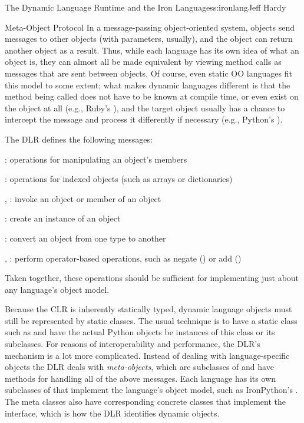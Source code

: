 \begin{aosachapter}{The Dynamic Language Runtime and the Iron Languages}{s:ironlang}{Jeff Hardy}
\begin{aosasect1}{Meta-Object Protocol}
In a message-passing object-oriented system, objects send messages to other
objects (with parameters, usually), and the object can return another object as
a result. Thus, while each language has its own idea of what an object is, they
can almost all be made equivalent by viewing method calls as messages that are
sent between objects. Of course, even static OO languages fit this model to
some extent; what makes dynamic languages different is that the method being
called does not have to be known at compile time, or even exist on the object
at all (e.g., Ruby's ), and the target object usually has
a chance to intercept the message and process it differently if necessary (e.g.,
Python's ).

The DLR defines the following messages:

\begin{aosaitemize}

\item {}: operations for manipulating an object's
members

\item {}: operations for indexed objects (such as
arrays or dictionaries)

\item {}, : invoke an object or member of an
object

\item {}: create an instance of an object

\item {}: convert an object from one type to another

\item {}, : perform operator-based
operations, such as negate (\code{!}) or add (\code{+})

\end{aosaitemize}

Taken together, these operations should be sufficient for implementing just
about any language's object model.

Because the CLR is inherently statically typed, dynamic language objects must
still be represented by static classes. The usual technique is to have a static
class such as  and have the actual Python objects be
instances of this class or its subclasses. For reasons of interoperability and
performance, the DLR's mechanism is a lot more complicated. Instead of dealing
with language-specific objects the DLR deals with \emph{meta-objects}, which
are subclasses of  and have methods for
handling all of the above messages. Each language has its own subclasses of
 that implement the language's object model, such as
IronPython's . The meta classes also have corresponding
concrete classes that implement the
 interface, which is how the
DLR identifies dynamic objects. 


\end{aosasect1}
\end{aosachapter}
